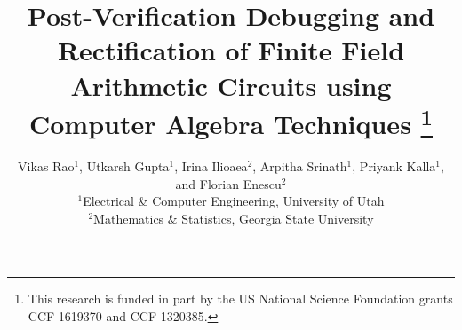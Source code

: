 \documentclass[10pt,twocolumn]{IEEEtran}
\theoremstyle{definition}
\begin{document}

\title{\Large{\sc Post-Verification Debugging and Rectification of
    Finite Field Arithmetic Circuits using Computer Algebra
    Techniques} 
  \thanks{This research is funded in part by the
   US National Science Foundation grants CCF-1619370 and
   CCF-1320385.}}

\author{Vikas Rao$^1$, Utkarsh Gupta$^1$, Irina Ilioaea$^2$, Arpitha Srinath$^1$, Priyank Kalla$^1$, and Florian Enescu$^2$\\
$^1$Electrical \& Computer Engineering, University of Utah\\
$^2$Mathematics \& Statistics, Georgia State University \vspace{-0.2in}
}

\maketitle

%



%


%

%



\end{document}
